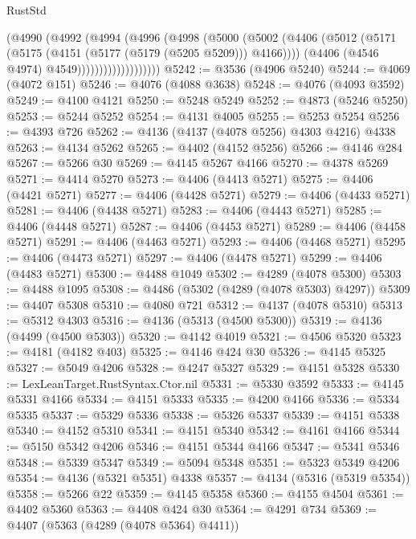 \begin{lexlean}{RustStd}
\begin{coremodule}
{\begin{coremodule}
{{{{{{{{{{{{{{{{{{{{{{{{{{{{{{{{{{{{{{{{{{{{{{{{{{                        (@4990
                          (@4992
                            (@4994
                              (@4996
                                (@4998
                                  (@5000
                                    (@5002
                                      (@4406
                                        (@5012
                                          (@5171
                                            (@5175 (@4151 (@5177 (@5179 (@5205 @5209))) @4166))))
                                        (@4406 (@4546 @4974) @4549)))))))))))))))))))
@5242 := @3536 (@4906 @5240)
@5244 := @4069 (@4072 @151)
@5246 := @4076 (@4088 @3638)
@5248 := @4076 (@4093 @3592)
@5249 := @4100 @4121
@5250 := @5248 @5249
@5252 := @4873 (@5246 @5250)
@5253 := @5244 @5252
@5254 := @4131 @4005
@5255 := @5253 @5254
@5256 := @4393 @726
@5262 := @4136 (@4137 (@4078 @5256) @4303 @4216) @4338
@5263 := @4134 @5262
@5265 := @4402 (@4152 @5256)
@5266 := @4146 @284
@5267 := @5266 @30
@5269 := @4145 @5267 @4166
@5270 := @4378 @5269
@5271 := @4414 @5270
@5273 := @4406 (@4413 @5271)
@5275 := @4406 (@4421 @5271)
@5277 := @4406 (@4428 @5271)
@5279 := @4406 (@4433 @5271)
@5281 := @4406 (@4438 @5271)
@5283 := @4406 (@4443 @5271)
@5285 := @4406 (@4448 @5271)
@5287 := @4406 (@4453 @5271)
@5289 := @4406 (@4458 @5271)
@5291 := @4406 (@4463 @5271)
@5293 := @4406 (@4468 @5271)
@5295 := @4406 (@4473 @5271)
@5297 := @4406 (@4478 @5271)
@5299 := @4406 (@4483 @5271)
@5300 := @4488 @1049
@5302 := @4289 (@4078 @5300)
@5303 := @4488 @1095
@5308 := @4486 (@5302 (@4289 (@4078 @5303) @4297))
@5309 := @4407 @5308
@5310 := @4080 @721
@5312 := @4137 (@4078 @5310)
@5313 := @5312 @4303
@5316 := @4136 (@5313 (@4500 @5300))
@5319 := @4136 (@4499 (@4500 @5303))
@5320 := @4142 @4019
@5321 := @4506 @5320
@5323 := @4181 (@4182 @403)
@5325 := @4146 @424 @30
@5326 := @4145 @5325
@5327 := @5049 @4206
@5328 := @4247 @5327
@5329 := @4151 @5328
@5330 := LexLeanTarget.RustSyntax.Ctor.nil
@5331 := @5330 @3592
@5333 := @4145 @5331 @4166
@5334 := @4151 @5333
@5335 := @4200 @4166
@5336 := @5334 @5335
@5337 := @5329 @5336
@5338 := @5326 @5337
@5339 := @4151 @5338
@5340 := @4152 @5310
@5341 := @4151 @5340
@5342 := @4161 @4166
@5344 := @5150 @5342 @4206
@5346 := @4151 @5344 @4166
@5347 := @5341 @5346
@5348 := @5339 @5347
@5349 := @5094 @5348
@5351 := @5323 @5349 @4206
@5354 := @4136 (@5321 @5351) @4338
@5357 := @4134 (@5316 (@5319 @5354))
@5358 := @5266 @22
@5359 := @4145 @5358
@5360 := @4155 @4504
@5361 := @4402 @5360
@5363 := @4408 @424 @30
@5364 := @4291 @734
@5369 := @4407 (@5363 (@4289 (@4078 @5364) @4411))
}}}}}}}}}}}}}}}}}}}}}}}}}}}}}}}}}}}}}}}}}}}}}}}}}}
\end{coremodule}}
\end{coremodule}
\end{lexlean}
